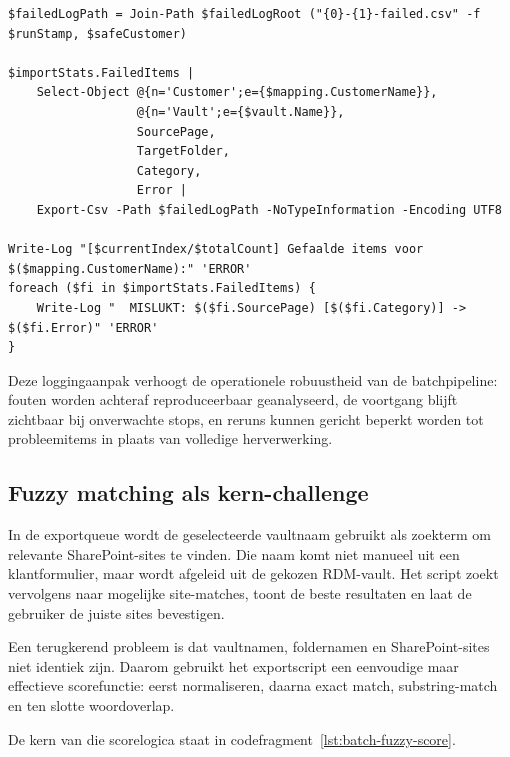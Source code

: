 \begin{listing}[H]
\begin{lstlisting}
$failedLogPath = Join-Path $failedLogRoot ("{0}-{1}-failed.csv" -f $runStamp, $safeCustomer)

$importStats.FailedItems |
    Select-Object @{n='Customer';e={$mapping.CustomerName}},
                  @{n='Vault';e={$vault.Name}},
                  SourcePage,
                  TargetFolder,
                  Category,
                  Error |
    Export-Csv -Path $failedLogPath -NoTypeInformation -Encoding UTF8

Write-Log "[$currentIndex/$totalCount] Gefaalde items voor $($mapping.CustomerName):" 'ERROR'
foreach ($fi in $importStats.FailedItems) {
    Write-Log "  MISLUKT: $($fi.SourcePage) [$($fi.Category)] -> $($fi.Error)" 'ERROR'
}
\end{lstlisting}
\caption{Gestructureerde registratie van resterende fouten in \texttt{Bulk-Import-Client-ToRDM2.ps1}}
\label{lst:batch-logging-failed-items}
\end{listing}

Deze loggingaanpak verhoogt de operationele robuustheid van de batchpipeline: fouten worden achteraf reproduceerbaar geanalyseerd, de voortgang blijft zichtbaar bij onverwachte stops, en reruns kunnen gericht beperkt worden tot probleemitems in plaats van volledige herverwerking.

\subsection{Fuzzy matching als kern-challenge}
\label{subsec:topic-fuzzy-matching}

In de exportqueue wordt de geselecteerde vaultnaam gebruikt als zoekterm om relevante SharePoint-sites te vinden. Die naam komt niet manueel uit een klantformulier, maar wordt afgeleid uit de gekozen RDM-vault. Het script zoekt vervolgens naar mogelijke site-matches, toont de beste resultaten en laat de gebruiker de juiste sites bevestigen.

Een terugkerend probleem is dat vaultnamen, foldernamen en SharePoint-sites niet identiek zijn. Daarom gebruikt het exportscript een eenvoudige maar effectieve scorefunctie: eerst normaliseren, daarna exact match, substring-match en ten slotte woordoverlap.

De kern van die scorelogica staat in codefragment~\ref{lst:batch-fuzzy-score}.

